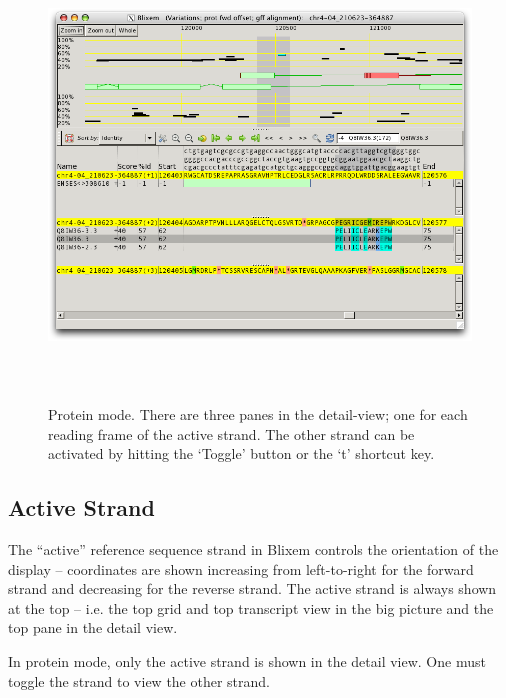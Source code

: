 \documentclass[letterpaper]{article}
\begin{document}
\begin{figure}
\centering
\color[rgb]{0.30980393,0.5058824,0.7411765}
\includegraphics[width=15.231cm,height=11.972cm]{img_window_protein_mode.png}
\caption{Protein mode. There are three
panes in the detail-view; one for each reading frame of the active
strand. The other strand can be activated by hitting the
{\textquoteleft}Toggle{\textquoteright} button or the
{\textquoteleft}t{\textquoteright} shortcut key.}
\end{figure}

\bigskip

{\color[rgb]{0.30980393,0.5058824,0.7411765}\subsection[Active Strand]{Active Strand}}
\hypertarget{RefHeading1621056909880}{}{
The {\textquotedblleft}active{\textquotedblright} reference sequence
strand in Blixem controls the orientation of the display -- coordinates
are shown increasing from left-to-right for the forward strand and
decreasing for the reverse strand. The active strand is always shown
at the top -- i.e. the top grid and top transcript view in the big
picture and the top pane in the detail view.}

\bigskip

In protein mode, only the active strand is shown in the detail view. One must toggle the strand to view the other strand.
\end{document}
